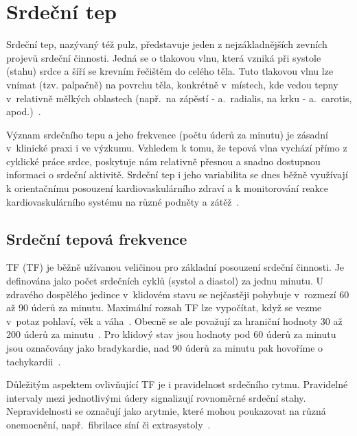 \chapter{Srdeční tep}
\label{chap:srdecni_tep}

Srdeční tep, nazývaný též pulz, představuje jeden z nejzákladnějších zevních projevů srdeční činnosti.
Jedná se o tlakovou vlnu, která vzniká při systole (stahu) srdce a šíří se krevním řečištěm do celého těla.
Tuto tlakovou vlnu lze vnímat (tzv. palpačně) na povrchu těla, konkrétně v~místech, kde vedou tepny v~relativně mělkých oblastech (např.~na zápěstí - a.~radialis, na krku - a.~carotis, apod.)~\cite{ENIKÖ, ucebniceFyziologie}.

Význam srdečního tepu a jeho frekvence (počtu úderů za minutu) je zásadní v~klinické praxi i ve výzkumu.
Vzhledem k tomu, že tepová vlna vychází přímo z cyklické práce srdce, poskytuje nám relativně přesnou a snadno dostupnou informaci o srdeční aktivitě.
Srdeční tep i jeho variabilita se dnes běžně využívají k orientačnímu posouzení kardiovaskulárního zdraví a k monitorování reakce kardiovaskulárního systému na různé podněty a zátěž~\cite{faktoryOvlivnujiciTep}.

\section{Srdeční tepová frekvence}
\label{sec:STF}

\acl{TF} (\acs{TF}) je běžně užívanou veličinou pro základní posouzení srdeční činnosti.
Je definována jako počet srdečních cyklů (systol a diastol) za jednu minutu.
U zdravého dospělého jedince v~klidovém stavu se nejčastěji pohybuje v~rozmezí 60 až 90 úderů za minutu.
Maximální rozsah \acs{TF} lze vypočítat, když se vezme v~potaz pohlaví, věk a váha~\cite{ENIKÖ}. 
Obecně se ale považují za hraniční hodnoty 30 až 200 úderů za minutu~\cite{PyPPG}.
Pro klidový stav jsou hodnoty pod 60 úderů za minutu jsou označovány jako bradykardie, nad 90 úderů za minutu pak hovoříme o tachykardii~\cite{ENIKÖ, vnitrniLekarstviVKostce}.

Důležitým aspektem ovlivňující \acs{TF} je i pravidelnost srdečního rytmu.
Pravidelné intervaly mezi jednotlivými údery signalizují rovnoměrné srdeční stahy.
Nepravidelnosti se označují jako arytmie, které mohou poukazovat na různá onemocnění, např.~fibrilace síní či extrasystoly~\cite{ENIKÖ}.


